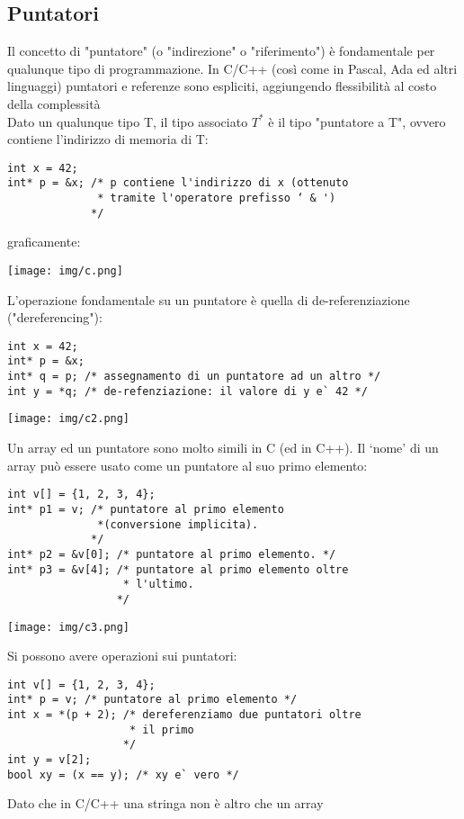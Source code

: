 \documentclass[a4paper,12pt, oneside]{book}
\begin{document}
\subsection{Puntatori}
Il concetto di "puntatore" (o "indirezione" o "riferimento") è fondamentale per qualunque tipo di programmazione. In C/C++ (così come in Pascal, Ada ed altri linguaggi) puntatori
e referenze sono espliciti, aggiungendo flessibilità al costo della complessità\\
Dato un qualunque tipo T, il tipo associato $T^*$ è il tipo "puntatore a T", ovvero contiene l'indirizzo di memoria di T:
\begin{verbatim}
int x = 42;
int* p = &x; /* p contiene l'indirizzo di x (ottenuto
              * tramite l'operatore prefisso ‘ & ')
             */
\end{verbatim}
graficamente:
\begin{center}
\texttt{[image: img/c.png]}
\end{center}
L'operazione fondamentale su un puntatore è quella di
de-referenziazione ("dereferencing"):
\begin{verbatim}
int x = 42;
int* p = &x;
int* q = p; /* assegnamento di un puntatore ad un altro */
int y = *q; /* de-refenziazione: il valore di y e` 42 */
\end{verbatim}
\begin{center}
\texttt{[image: img/c2.png]}
\end{center}
\newpage
Un array ed un puntatore sono molto simili in C (ed in C++). Il ‘nome' di un array può essere usato come un puntatore al suo primo elemento:
\begin{verbatim}
int v[] = {1, 2, 3, 4};
int* p1 = v; /* puntatore al primo elemento
              *(conversione implicita).
             */
int* p2 = &v[0]; /* puntatore al primo elemento. */
int* p3 = &v[4]; /* puntatore al primo elemento oltre
                  * l'ultimo.
                 */
\end{verbatim}
\begin{center}
\texttt{[image: img/c3.png]}
\end{center}
Si possono avere operazioni sui puntatori:
\begin{verbatim}
int v[] = {1, 2, 3, 4};
int* p = v; /* puntatore al primo elemento */
int x = *(p + 2); /* dereferenziamo due puntatori oltre
                   * il primo
                  */
int y = v[2];
bool xy = (x == y); /* xy e` vero */
\end{verbatim}
Dato che in C/C++ una stringa non è altro che un array
\end{document}
